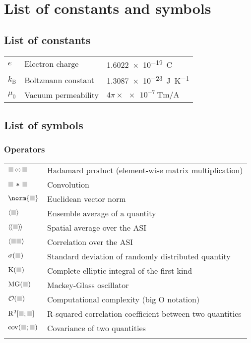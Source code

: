 \chapter{List of constants and symbols}
\section*{List of constants}
\begin{longtable}[l]{p{60pt} p{140pt} p{200pt}}
	$e$ & Electron charge & \SI{1.6022e-19}{\coulomb} \\
	$k_\mathrm{B}$ & Boltzmann constant & \SI{1.3087e-23}{\joule\per\kelvin} \\
	$\mu_0$ & Vacuum permeability & $4 \pi \times \SI{e-7}{\tesla\metre\per\ampere}$ \\
\end{longtable}

\section*{List of symbols}
\subsection*{Operators}
\begin{longtable}[l]{p{60pt} p{350pt}}
	$\greybox \odot \greybox$ & Hadamard product (element-wise matrix multiplication) \\
	$\greybox \hspace{0.15em} * \hspace{0.15em} \greybox$ & Convolution \\
	$\norm{ \greybox }$ & Euclidean vector norm \\
	$\langle \greybox \rangle$ & Ensemble average of a quantity \\
	$\llangle \greybox \rrangle$ & Spatial average over the ASI \\
	$\langle \greybox \greybox \rangle$ & Correlation over the ASI \\
	$\sigma( \greybox )$ & Standard deviation of randomly distributed quantity \\
	$\mathrm{K}(\greybox)$ & Complete elliptic integral of the first kind \\
	$\mathrm{MG}(\greybox)$ & Mackey-Glass oscillator \\
	$\mathcal{O}(\greybox)$ & Computational complexity (big O notation) \\
	$\mathrm{R}^2[\greybox;\greybox]$ & R-squared correlation coefficient between two quantities \\
	$\mathrm{cov}(\greybox;\greybox)$ & Covariance of two quantities \\
	&\\
\end{longtable}


